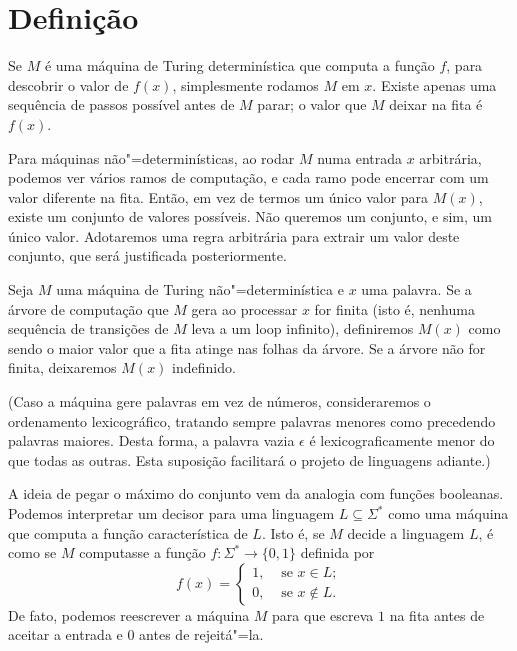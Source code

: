 \section{Definição}

Se $M$ é uma máquina de Turing determinística que computa a função $f$,
para descobrir o valor de $f(x)$,
simplesmente rodamos $M$ em $x$.
Existe apenas uma sequência de passos possível antes de $M$ parar;
o valor que $M$ deixar na fita é $f(x)$.

Para máquinas não"=determinísticas,
ao rodar $M$ numa entrada $x$ arbitrária,
podemos ver vários ramos de computação,
e cada ramo pode encerrar com um valor diferente na fita.
Então, em vez de termos um único valor para $M(x)$,
existe um conjunto de valores possíveis.
Não queremos um conjunto, e sim, um único valor.
Adotaremos uma regra arbitrária para extrair um valor deste conjunto,
que será justificada posteriormente.

\begin{definition}[Função não"=determinística\footnotemark]
    \label{def:nondeterministic_function}
    Seja $M$
    uma máquina de Turing não"=determinística
    e $x$ uma palavra.
    Se a árvore de computação que $M$ gera ao processar $x$ for finita
    (isto é, nenhuma sequência de transições de $M$ leva a um loop infinito),
    definiremos $M(x)$ como sendo o maior valor que a fita atinge
    nas folhas da árvore.
    Se a árvore não for finita, deixaremos $M(x)$ indefinido.

    (Caso a máquina gere palavras em vez de números,
    consideraremos o ordenamento lexicográfico,
    tratando sempre palavras menores como precedendo palavras maiores.
    Desta forma, a palavra vazia $\epsilon$
    é lexicograficamente menor do que todas as outras.
    Esta suposição facilitará o projeto de linguagens adiante.)
\end{definition}

A ideia de pegar o máximo do conjunto vem da analogia com funções booleanas.
Podemos interpretar um decisor para uma linguagem $L \subseteq \Sigma^*$
como uma máquina que computa a função característica de $L$.
Isto é,
se $M$ decide a linguagem $L$,
é como se $M$ computasse a função $f : \Sigma^* \rightarrow \{0, 1\}$
definida por
\begin{equation*}
    f(x) =
    \begin{cases}
        1,& \text{ se } x \in L; \\
        0,& \text{ se } x \notin L.
    \end{cases}
\end{equation*}
De fato, podemos reescrever a máquina $M$
para que escreva $1$ na fita antes de aceitar a entrada
e $0$ antes de rejeitá"=la.

